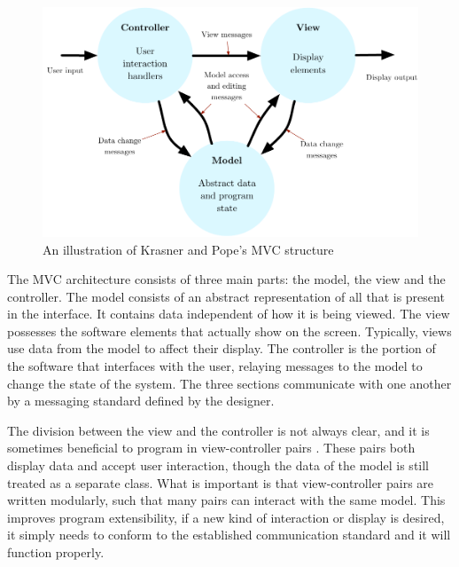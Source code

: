 \begin{figure}[h]
\centering
	\includegraphics[width=1\textwidth]{figures/MVC}
\caption{An illustration of Krasner and Pope's MVC structure}
\label{fig:mvc}
\end{figure}

The MVC architecture consists of three main parts: the model, the view and the controller. The model consists of an abstract representation of all that is present in the interface. It contains data independent of how it is being viewed. The view possesses the software elements that actually show on the screen. Typically, views use data from the model to affect their display. The controller is the portion of the software that interfaces with the user, relaying messages to the model to change the state of the system. The three sections communicate with one another by a messaging standard defined by the designer. 

The division between the view and the controller is not always clear, and it is sometimes beneficial to program in view-controller pairs \cite{MVC_krasnerpope}. These pairs both display data and accept user interaction, though the data of the model is still treated as a separate class. What is important is that view-controller pairs are written modularly, such that many pairs can interact with the same model. This improves program extensibility, if a new kind of interaction or display is desired, it simply needs to conform to the established communication standard and it will function properly.


	